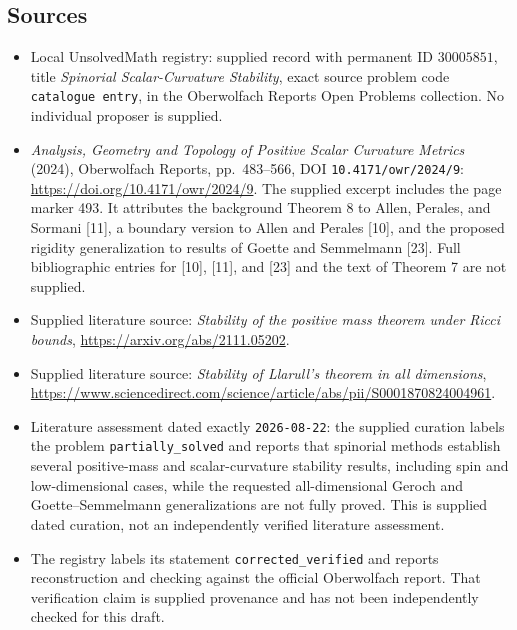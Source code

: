 \documentclass[11pt]{article}
\begin{document}
\subsection{Sources}
\begin{itemize}
\item Local UnsolvedMath registry: supplied record with permanent ID \(30005851\), title \emph{Spinorial Scalar-Curvature Stability}, exact source problem code \texttt{catalogue entry}, in the Oberwolfach Reports Open Problems collection. No individual proposer is supplied.
\item \emph{Analysis, Geometry and Topology of Positive Scalar Curvature Metrics} (2024), Oberwolfach Reports, pp.\ 483--566, DOI \texttt{10.4171/owr/2024/9}: \url{https://doi.org/10.4171/owr/2024/9}. The supplied excerpt includes the page marker 493. It attributes the background Theorem 8 to Allen, Perales, and Sormani [11], a boundary version to Allen and Perales [10], and the proposed rigidity generalization to results of Goette and Semmelmann [23]. Full bibliographic entries for [10], [11], and [23] and the text of Theorem 7 are not supplied.
\item Supplied literature source: \emph{Stability of the positive mass theorem under Ricci bounds}, \url{https://arxiv.org/abs/2111.05202}.
\item Supplied literature source: \emph{Stability of Llarull's theorem in all dimensions}, \url{https://www.sciencedirect.com/science/article/abs/pii/S0001870824004961}.
\item Literature assessment dated exactly \texttt{2026-08-22}: the supplied curation labels the problem \texttt{partially\_solved} and reports that spinorial methods establish several positive-mass and scalar-curvature stability results, including spin and low-dimensional cases, while the requested all-dimensional Geroch and Goette--Semmelmann generalizations are not fully proved. This is supplied dated curation, not an independently verified literature assessment.
\item The registry labels its statement \texttt{corrected\_verified} and reports reconstruction and checking against the official Oberwolfach report. That verification claim is supplied provenance and has not been independently checked for this draft.
\end{itemize}
\end{document}
